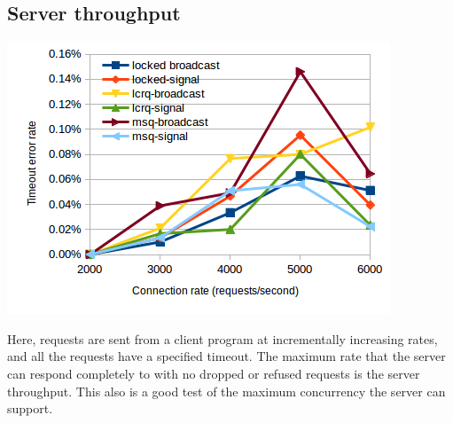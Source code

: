 \documentclass[twoside,10pt]{article}
\newenvironment{Figure}
  {\par\medskip\noindent\minipage{\linewidth}}
  {\endminipage\par\medskip}
\begin{document}
\begin{multicols}{2}



\subsection{Server throughput}

\begin{Figure}
\includegraphics[width=\linewidth]{img/throughputmedian.png}
\end{Figure}

Here, requests are sent from a client program at incrementally
increasing rates, and all the requests have a specified
timeout. The maximum rate that the server can respond completely to
with no dropped or refused requests is the server throughput. This
also is a good test of the maximum concurrency the server can support.


\end{multicols}
\end{document}
